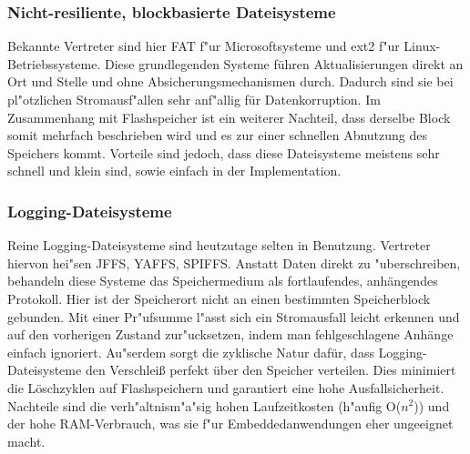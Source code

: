 \documentclass[11pt]{article}
\begin{document}
\subsubsection{Nicht-resiliente, blockbasierte Dateisysteme}
Bekannte Vertreter sind hier FAT f"ur Microsoftsysteme und ext2 f"ur Linux-Betriebssysteme.
Diese grundlegenden Systeme führen Aktualisierungen direkt an Ort und Stelle
und ohne Absicherungsmechanismen durch. Dadurch sind sie bei pl"otzlichen Stromausf"allen 
sehr anf"allig für Datenkorruption. Im Zusammenhang mit Flashspeicher ist ein weiterer Nachteil,
dass derselbe Block somit mehrfach beschrieben wird und es zur einer schnellen Abnutzung des Speichers kommt.
Vorteile sind jedoch, dass diese Dateisysteme meistens 
sehr schnell und klein sind, sowie einfach in der Implementation.

\subsubsection{Logging-Dateisysteme}
Reine Logging-Dateisysteme sind heutzutage selten in Benutzung. 
Vertreter hiervon hei"sen JFFS, YAFFS, SPIFFS.
Anstatt Daten direkt zu "uberschreiben, 
behandeln diese Systeme das Speichermedium als fortlaufendes, 
anhängendes Protokoll. Hier ist der Speicherort nicht an einen bestimmten
Speicherblock gebunden.
Mit einer Pr"ufsumme l"asst sich ein Stromausfall leicht erkennen
und auf den vorherigen Zustand zur"ucksetzen, indem man fehlgeschlagene Anhänge einfach ignoriert.
Au"serdem sorgt die zyklische Natur dafür, dass Logging-Dateisysteme den Verschleiß
perfekt über den Speicher verteilen.
Dies minimiert die Löschzyklen auf Flashspeichern 
und garantiert eine hohe Ausfallsicherheit.
Nachteile sind die verh"altnism"a"sig hohen Laufzeitkosten (h"aufig O($n^2$)) und der hohe RAM-Verbrauch,
was sie f"ur Embeddedanwendungen eher ungeeignet macht.
\end{document}
